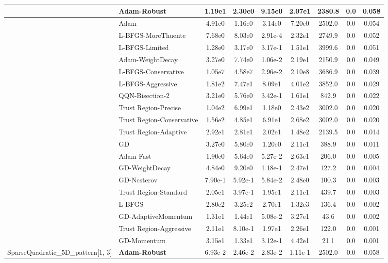 \documentclass{article}
\begin{document}
\begin{longtable}{|l|l|c|c|c|c|c|c|c|}
\hline
 & Adam-Robust & 1.19e1 & 2.30e0 & 9.15e0 & 2.07e1 & 2380.8 & 0.0 & 0.058 \\
\hline
 & Adam & 4.91e0 & 1.16e0 & 3.14e0 & 7.20e0 & 2502.0 & 0.0 & 0.054 \\
\hline
 & L-BFGS-MoreThuente & 7.68e0 & 8.03e0 & 2.91e-4 & 2.32e1 & 2749.9 & 0.0 & 0.052 \\
\hline
 & L-BFGS-Limited & 1.28e0 & 3.17e0 & 3.17e-1 & 1.51e1 & 3999.6 & 0.0 & 0.051 \\
\hline
 & Adam-WeightDecay & 3.27e0 & 7.74e0 & 1.06e-2 & 2.19e1 & 2150.9 & 0.0 & 0.049 \\
\hline
 & L-BFGS-Conservative & 1.05e7 & 4.58e7 & 2.96e-2 & 2.10e8 & 3686.9 & 0.0 & 0.039 \\
\hline
 & L-BFGS-Aggressive & 1.81e2 & 7.47e1 & 8.09e1 & 4.01e2 & 3852.0 & 0.0 & 0.029 \\
\hline
 & QQN-Bisection-2 & 3.21e0 & 5.76e0 & 3.42e-1 & 1.61e1 & 842.9 & 0.0 & 0.022 \\
\hline
 & Trust Region-Precise & 1.04e2 & 6.99e1 & 1.18e0 & 2.43e2 & 3002.0 & 0.0 & 0.020 \\
\hline
 & Trust Region-Conservative & 1.56e2 & 4.85e1 & 6.91e1 & 2.68e2 & 3002.0 & 0.0 & 0.020 \\
\hline
 & Trust Region-Adaptive & 2.92e1 & 2.81e1 & 2.02e1 & 1.48e2 & 2139.5 & 0.0 & 0.014 \\
\hline
 & GD & 3.27e0 & 5.80e0 & 1.20e0 & 2.11e1 & 388.9 & 0.0 & 0.011 \\
\hline
 & Adam-Fast & 1.90e0 & 5.64e0 & 5.27e-2 & 2.63e1 & 206.0 & 0.0 & 0.005 \\
\hline
 & GD-WeightDecay & 4.84e0 & 9.20e0 & 1.18e-1 & 2.47e1 & 127.2 & 0.0 & 0.004 \\
\hline
 & GD-Nesterov & 7.90e-1 & 5.92e-1 & 5.84e-2 & 2.48e0 & 100.3 & 0.0 & 0.003 \\
\hline
 & Trust Region-Standard & 2.05e1 & 3.97e-1 & 1.95e1 & 2.11e1 & 439.7 & 0.0 & 0.003 \\
\hline
 & L-BFGS & 2.80e2 & 3.25e2 & 2.70e1 & 1.32e3 & 136.4 & 0.0 & 0.002 \\
\hline
 & GD-AdaptiveMomentum & 1.31e1 & 1.44e1 & 5.08e-2 & 3.27e1 & 43.6 & 0.0 & 0.002 \\
\hline
 & Trust Region-Aggressive & 2.11e1 & 8.10e-1 & 1.97e1 & 2.26e1 & 122.0 & 0.0 & 0.001 \\
\hline
 & GD-Momentum & 3.15e1 & 1.33e1 & 3.12e-1 & 4.42e1 & 21.1 & 0.0 & 0.001 \\
SparseQuadratic\_5D\_pattern[1, 3] & \textbf{Adam-Robust} & 6.93e-2 & 2.46e-2 & 2.83e-2 & 1.11e-1 & 2502.0 & 0.0 & 0.058 \\

\end{longtable}
\end{document}
